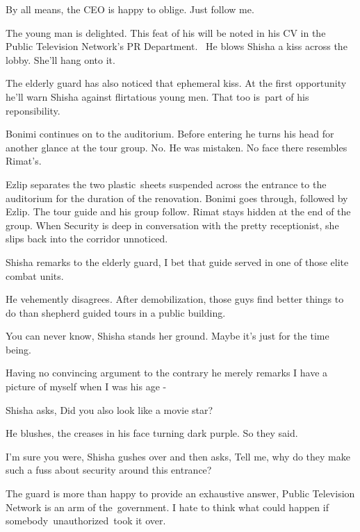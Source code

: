 \documentclass[letterpaper]{article}
\begin{document}
{\textquotedbl}By all means,{\textquotedbl} the CEO is happy to oblige. {\textquotedbl}Just follow me.{\textquotedbl}

The young man is delighted. This feat of his will be noted in his CV in the Public Television Network's PR Department.
~He blows Shisha a kiss across the lobby. She'll hang onto it.

The elderly guard has also noticed that ephemeral kiss. \MakeUppercase{A}t the first opportunity he'll warn Shisha
against flirtatious young men. That too is~part of his reponsibility.

Bonimi continues on to the auditorium. Before entering he turns his head for another glance at the tour group. No. He
was mistaken. No face there resembles Rimat's. 

Ezlip separates the two plastic~sheets suspended across the entrance to the auditorium for the duration of the
renovation. Bonimi goes through, followed by Ezlip. The tour guide and his group follow. Rimat stays hidden at the end
of the group. When Security is deep in conversation with the pretty receptionist, she slips back into the corridor
unnoticed.

Shisha remarks to the elderly guard, {\textquotedbl}I bet that guide served in one of those elite combat
units.{\textquotedbl} \ 

He vehemently disagrees. {\textquotedbl}After demobilization, those guys find better things to do than shepherd guided
tours in a public building.{\textquotedbl} 

{\textquotedbl}You can never know,{\textquotedbl} Shisha stands her ground. {\textquotedbl}Maybe it's just for the time
being.{\textquotedbl} 

Having no convincing argument to the contrary he merely remarks {\textquotedbl}I have a picture of myself when I was his
age -{\textquotedbl} \ 

Shisha asks, {\textquotedbl}Did you also look like a movie star?{\textquotedbl} 

He blushes, the creases in his face turning dark purple. {\textquotedbl}So they said.{\textquotedbl}~ 

{\textquotedbl}I'm sure you were,{\textquotedbl} Shisha gushes over and then asks, {\textquotedbl}Tell me, why do they
make such a fuss about security around this entrance?{\textquotedbl} 

The guard is more than happy to provide an exhaustive answer, {\textquotedbl}Public Television Network is an arm of
the~government. I hate to think what could happen if somebody~unauthorized~took it over.{\textquotedbl} 
\end{document}
